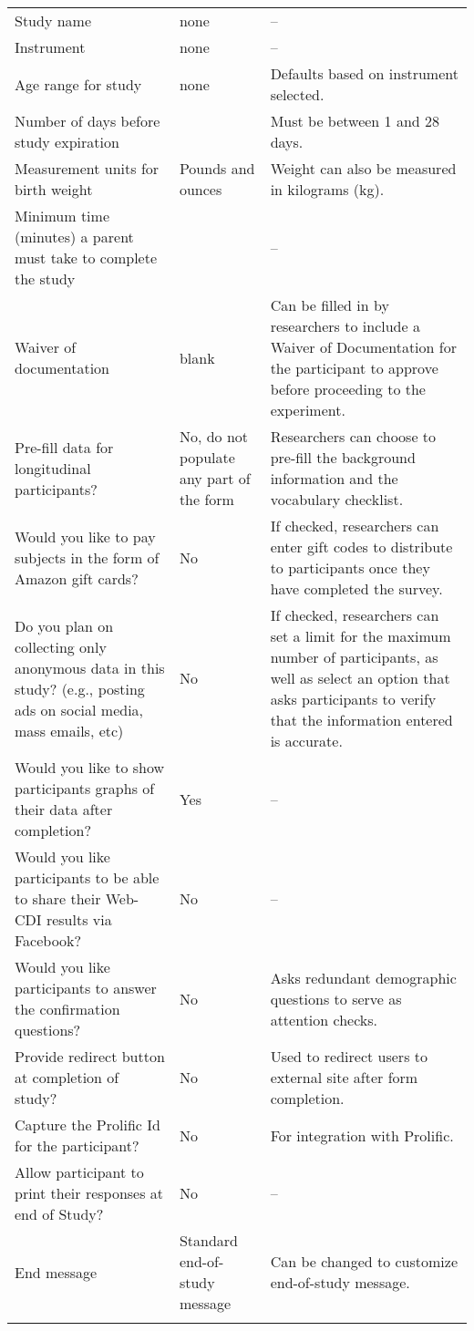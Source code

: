 \begin{appendix}
\begin{longtable}[t]{>{\raggedright\arraybackslash}p{2.2in}>{\raggedright\arraybackslash}p{1.2in}>{\raggedright\arraybackslash}p{2.2in}}
\endfoot
\bottomrule
\endlastfoot
Study name & none & --\\
Instrument & none & --\\
Age range for study & none & Defaults based on instrument selected.\\
Number of days before study expiration & 14 & Must be between 1 and 28 days.\\
Measurement units for birth weight & Pounds and ounces & Weight can also be measured in kilograms (kg).\\
Minimum time (minutes) a parent must take to complete the study & 6 & --\\
Waiver of documentation & blank & Can be filled in by researchers to include a Waiver of Documentation for the participant to approve before proceeding to the experiment.\\
Pre-fill data for longitudinal participants? & No, do not populate any part of the form & Researchers can choose to pre-fill the background information and the vocabulary checklist.\\
Would you like to pay subjects in the form of Amazon gift cards? & No & If checked, researchers can enter gift codes to distribute to participants once they have completed the survey.\\
Do you plan on collecting only anonymous data in this study? (e.g., posting ads on social media, mass emails, etc) & No & If checked, researchers can set a limit for the maximum number of participants, as well as select an option that asks participants to verify that the information entered is accurate.\\
Would you like to show participants graphs of their data after completion? & Yes & --\\
Would you like participants to be able to share their Web-CDI results via Facebook? & No & --\\
Would you like participants to answer the confirmation questions? & No & Asks redundant demographic questions to serve as attention checks.\\
Provide redirect button at completion of study? & No & Used to redirect users to external site after form completion.\\
Capture the Prolific Id for the participant? & No & For integration with Prolific.\\
Allow participant to print their responses at end of Study? & No & --\\
End message & Standard end-of-study message & Can be changed to customize end-of-study message.\\*
\end{longtable}


\end{appendix}
